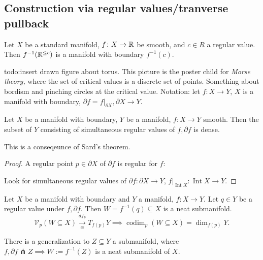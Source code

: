 \subsection{Construction via regular values/tranverse pullback}
\begin{prop}
    Let $X$ be a standard manifold, $f \colon X \to \mathbb{R}$ be smooth, and $c \in R$ a regular value. Then $f ^{-1}(\mathbb{R}^{\leq c})$ is a manifold with boundary $f^{-1}(c)$.
\end{prop}
{\color{red}todo:insert drawn figure about torus}. This picture is the poster child for \emph{Morse theory,} where the set of critical values is a discrete set of points. Something about bordism and pinching circles at the critical value. Notation: let $f \colon X \to Y$, $X$ is a manifold with boundary, $\partial f=f|_{\partial X}, \partial X\to Y$.
\begin{theorem}
    Let $X$ be a manifold with boundary, $Y$ be a manifold, $f \colon X \to Y$ smooth. Then the subset of $Y$ consisting of simultaneous regular values of $f, \partial f$ is dense.
\end{theorem}
This is a conseqeunce of Sard's theorem.
\begin{proof}
    A regular point $p \in \partial X$ of $\partial f$ is regular for $f$:
    \begin{figure}[H]
    \centering
    \end{figure}Look for simultaneous regular values of $\partial f \colon \partial X \to Y$, $f|_{\operatorname{Int}X}\colon \operatorname{Int}X \to Y$.
\end{proof}
\begin{theorem}
    Let $X$ be a manifold with boundary and $Y$ a manifold, $f \colon X \to Y$. Let $q \in Y$ be a regular value under $f, \partial f$. Then $W=f ^{-1}(q) \subseteq X$ is a neat submanifold. \[
        \mathcal{V} _p(W \subseteq X) \underset{\cong}{\xrightarrow{df_p} } T_{f(p)}Y \implies \operatorname{codim}_p(W \subseteq X)=\dim _{f(p)}Y.
    \] 
\end{theorem}
\begin{remark}
    There is a generalization to $Z \subseteq Y$ a submanifold, where $f ,\partial f \pitchfork Z\implies  W:= f^{-1}(Z)$ is a neat submanifold of $X$.
\end{remark}
